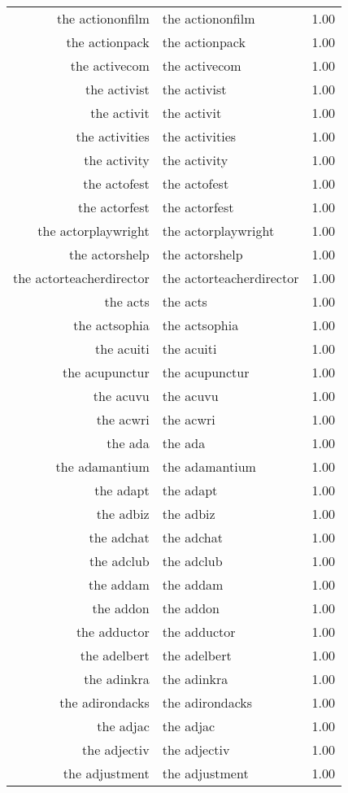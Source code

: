 \begin{table}[ht]
\begin{tabular}{rlr}
  the actiononfilm & the actiononfilm & 1.00 \\ 
  the actionpack & the actionpack & 1.00 \\ 
  the activecom & the activecom & 1.00 \\ 
  the activist & the activist & 1.00 \\ 
  the activit & the activit & 1.00 \\ 
  the activities & the activities & 1.00 \\ 
  the activity & the activity & 1.00 \\ 
  the actofest & the actofest & 1.00 \\ 
  the actorfest & the actorfest & 1.00 \\ 
  the actorplaywright & the actorplaywright & 1.00 \\ 
  the actorshelp & the actorshelp & 1.00 \\ 
  the actorteacherdirector & the actorteacherdirector & 1.00 \\ 
  the acts & the acts & 1.00 \\ 
  the actsophia & the actsophia & 1.00 \\ 
  the acuiti & the acuiti & 1.00 \\ 
  the acupunctur & the acupunctur & 1.00 \\ 
  the acuvu & the acuvu & 1.00 \\ 
  the acwri & the acwri & 1.00 \\ 
  the ada & the ada & 1.00 \\ 
  the adamantium & the adamantium & 1.00 \\ 
  the adapt & the adapt & 1.00 \\ 
  the adbiz & the adbiz & 1.00 \\ 
  the adchat & the adchat & 1.00 \\ 
  the adclub & the adclub & 1.00 \\ 
  the addam & the addam & 1.00 \\ 
  the addon & the addon & 1.00 \\ 
  the adductor & the adductor & 1.00 \\ 
  the adelbert & the adelbert & 1.00 \\ 
  the adinkra & the adinkra & 1.00 \\ 
  the adirondacks & the adirondacks & 1.00 \\ 
  the adjac & the adjac & 1.00 \\ 
  the adjectiv & the adjectiv & 1.00 \\ 
  the adjustment & the adjustment & 1.00 \\ 

\end{tabular}
\end{table}
